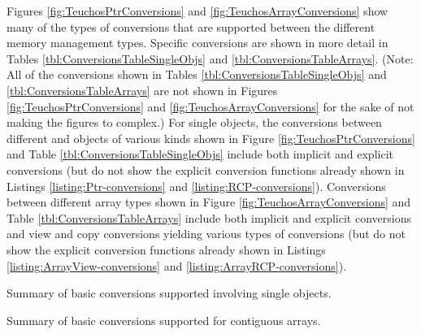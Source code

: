 \documentclass[pdf,ps2pdf,11pt]{SANDreport}
\begin{document}
Figures {}\ref{fig:TeuchosPtrConversions} and
{}\ref{fig:TeuchosArrayConversions} show many of the types of
conversions that are supported between the different memory management
types.  Specific conversions are shown in more detail in Tables
{}\ref{tbl:ConversionsTableSingleObjs} and
{}\ref{tbl:ConversionsTableArrays}.  (Note: All of the conversions
shown in Tables {}\ref{tbl:ConversionsTableSingleObjs} and
{}\ref{tbl:ConversionsTableArrays} are not shown in Figures
{}\ref{fig:TeuchosPtrConversions} and
{}\ref{fig:TeuchosArrayConversions} for the sake of not making the
figures to complex.)  For single objects, the conversions between
different {} and {} objects of various kinds shown
in Figure {}\ref{fig:TeuchosPtrConversions} and Table
{}\ref{tbl:ConversionsTableSingleObjs} include both implicit and
explicit conversions (but do not show the explicit conversion
functions already shown in Listings {}\ref{listing:Ptr-conversions}
and {}\ref{listing:RCP-conversions}).  Conversions between different
array types shown in Figure {}\ref{fig:TeuchosArrayConversions} and
Table {}\ref{tbl:ConversionsTableArrays} include both implicit and
explicit conversions and view and copy conversions yielding various
types of conversions (but do not show the explicit conversion
functions already shown in Listings
{}\ref{listing:ArrayView-conversions} and
{}\ref{listing:ArrayRCP-conversions}).


\begin{table}
\begin{center}

\caption{\label{tbl:ConversionsTableSingleObjs}
Summary of basic conversions supported involving single objects.}
\end{center}
\end{table}


\begin{table}
\begin{center}

\caption{\label{tbl:ConversionsTableArrays}
Summary of basic conversions supported for contiguous arrays.}
\end{center}
\end{table}
\end{document}
